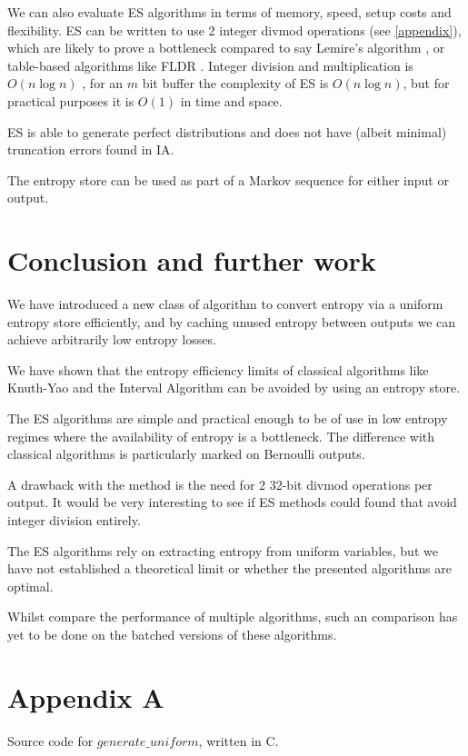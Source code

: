 \documentclass[12pt]{article}
\begin{document}
We can also evaluate ES algorithms in terms of memory, speed, setup costs and flexibility. ES can be written to use 2 integer divmod operations (see \ref{appendix}), which are likely to prove a bottleneck compared to say Lemire's algorithm \cite{lemire2019fast}, or table-based algorithms like FLDR \cite{saad2020fldr,saad2025}. Integer division and multiplication is $O(n \log n)$ \cite{harvey2021integer}, for an $m$ bit buffer the complexity of ES is $O(n \log n)$, but for practical purposes it is $O(1)$ in time and space.

ES is able to generate perfect distributions and does not have (albeit minimal) truncation errors found in IA.

The entropy store can be used as part of a Markov sequence for either input or output.

\section{Conclusion and further work}

We have introduced a new class of algorithm to convert entropy via a uniform entropy store efficiently, and by caching unused entropy between outputs we can achieve arbitrarily low entropy losses.

We have shown that the entropy efficiency limits of classical algorithms like Knuth-Yao and the Interval Algorithm can be avoided by using an entropy store. 

The ES algorithms are simple and practical enough to be of use in low entropy regimes where the availability of entropy is a bottleneck. The difference with classical algorithms is particularly marked on Bernoulli outputs.

A drawback with the method is the need for 2 32-bit divmod operations per output. It would be very interesting to see if ES methods could found that avoid integer division entirely.

The ES algorithms rely on extracting entropy from uniform variables, but we have not established a theoretical limit or whether the presented algorithms are optimal.

Whilst \cite{saad2020fldr} compare the performance of multiple algorithms, such an comparison has yet to be done on the batched versions of these algorithms.



\printbibliography

\section {Appendix A}
Source code for $generate\_uniform$, written in C.
\end{document}
